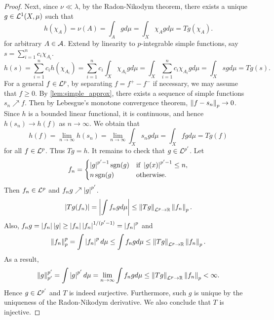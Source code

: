 \begin{proof}
    Next, since $\nu\ll\lambda$, by the Radon-Nikodym theorem, 
    there exists a unique $g\in\mathcal{L}^1(X,\mu)$ such that 
    \begin{equation*}
        h(\chi_A) = \nu(A) = \int_A gd\mu = \int_X \chi_A gd\mu 
        = Tg(\chi_A).
    \end{equation*} 
    for arbitrary $A\in\mathcal{A}$. Extend by linearity to $p$-integrable 
    simple functions, say $s = \sum_{i=1}^n c_i\chi_{A_i}$. 
    \begin{equation*}
        h(s) = \sum_{i=1}^n c_ih(\chi_{A_i}) 
        = \sum_{i=1}^n c_i\int_X \chi_{A_i}gd\mu 
        = \int_X \sum_{i=1}^n c_i\chi_{A_i}gd\mu 
        = \int_X sgd\mu = Tg(s).
    \end{equation*}
    For a general $f\in\mathcal{L}^p$, by separating $f = f^+ - f^-$ 
    if necessary, we may assume that $f\geq 0$. By 
    \cref{lem:simple_approx}, there exists a sequence of simple 
    functions $s_n\nearrow f$. Then by Lebesgue's monotone 
    convergence theorem, $\left\lVert {f-s_n} \right\rVert_p\to 0$. Since $h$ is 
    a bounded linear functional, it is continuous, and hence 
    $h(s_n)\to h(f)$ as $n\to\infty$. We obtain that 
    \begin{equation*}
        h(f) = \lim_{n\to\infty} h(s_n) = \lim_{n\to\infty} \int_X s_ngd\mu 
        = \int_X fgd\mu = Tg(f)
    \end{equation*}
    for all $f\in\mathcal{L}^p$. Thus $Tg = h$. It remains to check 
    that $g\in\mathcal{L}^{p'}$. Let 
    \begin{equation*}
        f_n = \begin{cases}
            \left\lvert {g} \right\rvert^{p'-1}\operatorname{sgn}(g) & \text{if } \left\lvert {g(x)} \right\rvert^{p'-1} \leq n, \\
            n\operatorname{sgn}(g) & \text{otherwise}.
        \end{cases}
    \end{equation*}
    Then $f_n\in\mathcal{L}^p$ and $f_ng\nearrow\left\lvert {g} \right\rvert^{p'}$. 
    \begin{equation*}
        \left\lvert {Tg(f_n)} \right\rvert = \left\lvert {\int f_ngd\mu} \right\rvert \leq \left\lVert {Tg} \right\rVert_{\mathcal{L}^p\to\mathbb{R}}\left\lVert {f_n} \right\rVert_p.
    \end{equation*}
    Also, $f_ng = \left\lvert {f_n} \right\rvert\left\lvert {g} \right\rvert \geq \left\lvert {f_n} \right\rvert\left\lvert {f_n} \right\rvert^{1/(p'-1)} = \left\lvert {f_n} \right\rvert^p$ and 
    \begin{equation*}
        \left\lVert {f_n} \right\rVert_p^p = \int \left\lvert {f_n} \right\rvert^pd\mu \leq \int f_ngd\mu \leq \left\lVert {Tg} \right\rVert_{\mathcal{L}^p\to\mathbb{R}}\left\lVert {f_n} \right\rVert_p.
    \end{equation*}
    As a result, 
    \begin{equation*}
        \left\lVert {g} \right\rVert_{p'}^{p'} = \int \left\lvert {g} \right\rvert^{p'}d\mu = \lim_{n\to\infty} \int f_ngd\mu 
        \leq \left\lVert {Tg} \right\rVert_{\mathcal{L}^p\to\mathbb{R}}\left\lVert {f_n} \right\rVert_p < \infty.
    \end{equation*}
    Hence $g\in\mathcal{L}^{p'}$ and $T$ is indeed surjective. Furthermore, 
    such $g$ is unique by the uniqueness of the Radon-Nikodym 
    derivative. We also conclude that $T$ is injective. 


\end{proof}
